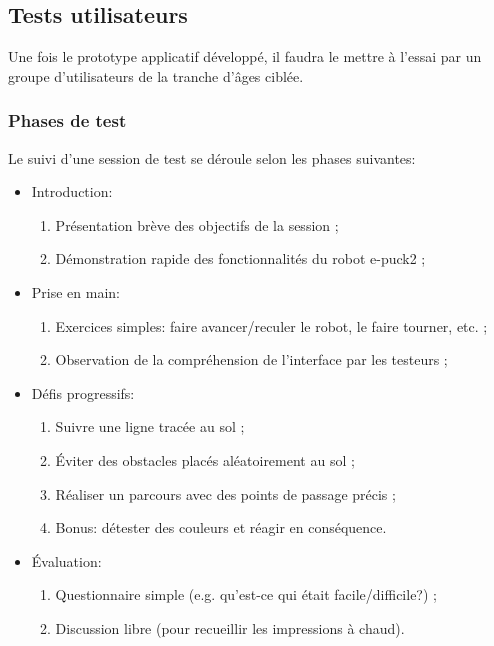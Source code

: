\subsection{Tests utilisateurs}

Une fois le prototype applicatif développé, il faudra le mettre à l'essai par un groupe d'utilisateurs de la tranche d'âges ciblée.

\subsubsection{Phases de test}
Le suivi d'une session de test se déroule selon les phases suivantes:
\begin{itemize}
    \item Introduction:
        \begin{enumerate}
            \item Présentation brève des objectifs de la session ;
            \item Démonstration rapide des fonctionnalités du robot e-puck2 ;
        \end{enumerate}

    \item Prise en main:
        \begin{enumerate}
            \item Exercices simples: faire avancer/reculer le robot, le faire tourner, etc. ;
            \item Observation de la compréhension de l'interface par les testeurs ;
        \end{enumerate}

    \item Défis progressifs:
        \begin{enumerate}
            \item Suivre une ligne tracée au sol ;
            \item Éviter des obstacles placés aléatoirement au sol ;
            \item Réaliser un parcours avec des points de passage précis ;
            \item Bonus: détester des couleurs et réagir en conséquence.
        \end{enumerate}

    \item Évaluation: 
        \begin{enumerate}
            \item Questionnaire simple (e.g. qu'est-ce qui était facile/difficile?) ;
            \item Discussion libre (pour recueillir les impressions à chaud).
        \end{enumerate}
\end{itemize}

